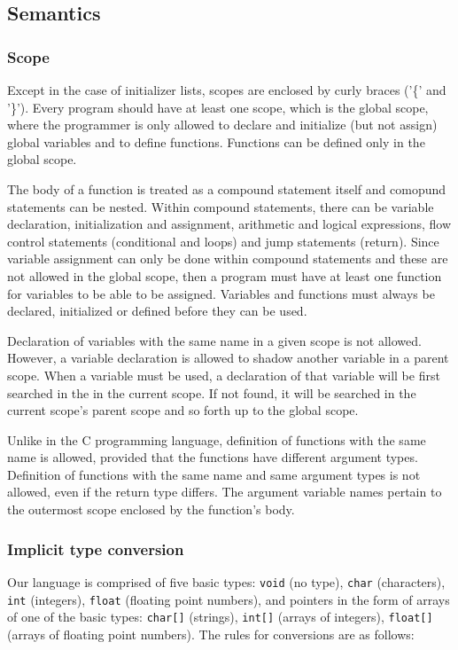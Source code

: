 \subsection{Semantics}

\subsubsection{Scope}

Except in the case of initializer lists, scopes are enclosed by curly
braces ('\{' and '\}'). Every program should have at least one scope,
which is the global scope, where the programmer is only allowed to
declare and initialize (but not assign) global variables and to
define functions. Functions can be defined only in the global scope.

The body of a function is treated as a compound statement itself 
and comopund statements can be nested. Within compound statements,
there can be variable declaration, initialization and assignment,
arithmetic and logical expressions, flow control statements
(conditional and loops) and jump statements (return).
Since variable assignment can only be done within compound statements
and these are not allowed in the global scope, then a program must
have at least one function for variables to be able to be assigned.
Variables and functions must always be declared, initialized or defined 
before they can be used.

Declaration of variables with the same name in a given scope is
not allowed. However, a variable declaration is allowed to shadow
another variable in a parent scope. When a variable must be used,
a declaration of that variable will be first searched in the
in the current scope. If not found, it will be searched in the
current scope's parent scope and so forth up to the global scope.

Unlike in the C programming language, definition of functions with
the same name is allowed, provided that the functions have different
argument types. Definition of functions with the same name and same
argument types is not allowed, even if the return type differs.
The argument variable names pertain to the outermost scope enclosed
by the function's body.



\subsubsection{Implicit type conversion}

Our language is comprised of five basic types:
\texttt{void} (no type), 
\texttt{char} (characters),
\texttt{int} (integers),
\texttt{float} (floating point numbers),
and pointers in the form of arrays of one of the basic types:
\texttt{char[]} (strings),
\texttt{int[]} (arrays of integers),
\texttt{float[]} (arrays of floating point numbers).
 The rules for conversions are as follows:

